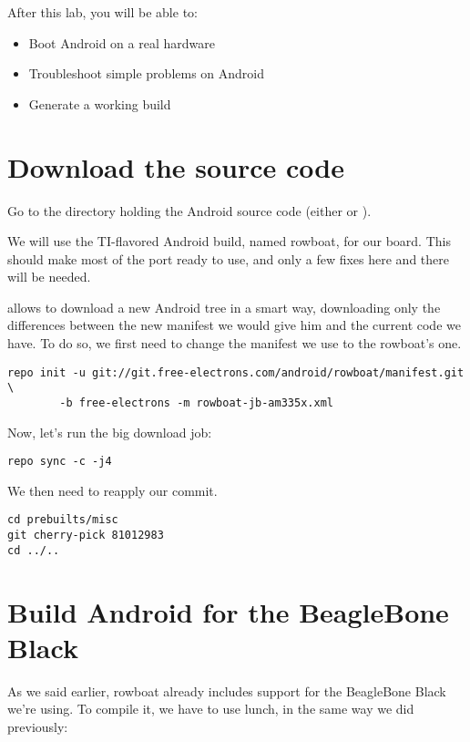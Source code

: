 
After this lab, you will be able to:
\begin{itemize}
  \item Boot Android on a real hardware
  \item Troubleshoot simple problems on Android
  \item Generate a working build
\end{itemize}

\section{Download the source code}

Go to the directory holding the Android source code (either
 or ).

We will use the TI-flavored Android build, named rowboat, for our
board. This should make most of the port ready to use, and only a few
fixes here and there will be needed.

 allows to download a new Android tree in a smart way,
downloading only the differences between the new manifest we would
give him and the current code we have. To do so, we first need to
change the manifest we use to the rowboat's one.

\begin{verbatim}
repo init -u git://git.free-electrons.com/android/rowboat/manifest.git \
        -b free-electrons -m rowboat-jb-am335x.xml
\end{verbatim}

Now, let's run the big download job:
\begin{verbatim}
repo sync -c -j4
\end{verbatim}

We then need to reapply our  commit.
\begin{verbatim}
cd prebuilts/misc
git cherry-pick 81012983
cd ../..
\end{verbatim}

\section{Build Android for the BeagleBone Black}

As we said earlier, rowboat already includes support for the
BeagleBone Black we're using. To compile it, we have to use lunch, in
the same way we did previously:


